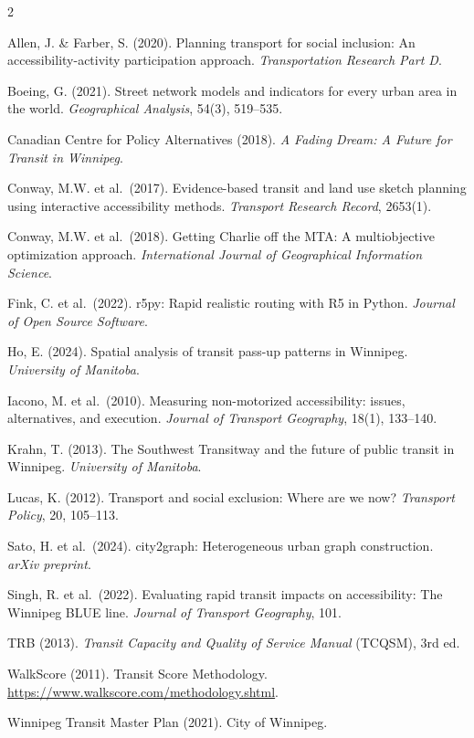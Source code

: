 \documentclass[11pt]{article}
\begin{document}
{\footnotesize
\begin{multicols}{2}
\begin{enumerate}[label={[\arabic*]}]
\item Allen, J. \& Farber, S. (2020). Planning transport for social inclusion: An accessibility-activity participation approach. \emph{Transportation Research Part D}.
\item Boeing, G. (2021). Street network models and indicators for every urban area in the world. \emph{Geographical Analysis}, 54(3), 519--535.
\item Canadian Centre for Policy Alternatives (2018). \emph{A Fading Dream: A Future for Transit in Winnipeg}.
\item Conway, M.W. et al.\ (2017). Evidence-based transit and land use sketch planning using interactive accessibility methods. \emph{Transport Research Record}, 2653(1).
\item Conway, M.W. et al.\ (2018). Getting Charlie off the MTA: A multiobjective optimization approach. \emph{International Journal of Geographical Information Science}.
\item Fink, C. et al.\ (2022). r5py: Rapid realistic routing with R5 in Python. \emph{Journal of Open Source Software}.
\item Ho, E. (2024). Spatial analysis of transit pass-up patterns in Winnipeg. \emph{University of Manitoba}.
\item Iacono, M. et al.\ (2010). Measuring non-motorized accessibility: issues, alternatives, and execution. \emph{Journal of Transport Geography}, 18(1), 133--140.
\item Krahn, T. (2013). The Southwest Transitway and the future of public transit in Winnipeg. \emph{University of Manitoba}.
\item Lucas, K. (2012). Transport and social exclusion: Where are we now? \emph{Transport Policy}, 20, 105--113.
\item Sato, H. et al.\ (2024). city2graph: Heterogeneous urban graph construction. \emph{arXiv preprint}.
\item Singh, R. et al.\ (2022). Evaluating rapid transit impacts on accessibility: The Winnipeg BLUE line. \emph{Journal of Transport Geography}, 101.
\item TRB (2013). \emph{Transit Capacity and Quality of Service Manual} (TCQSM), 3rd ed.
\item WalkScore (2011). Transit Score Methodology. \url{https://www.walkscore.com/methodology.shtml}.
\item Winnipeg Transit Master Plan (2021). City of Winnipeg.

\end{enumerate}
\end{multicols}}
\end{document}
